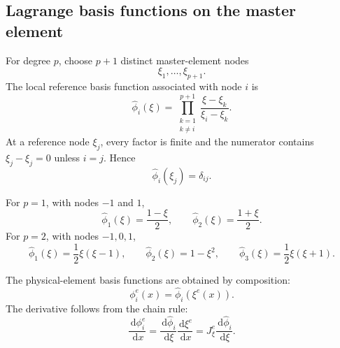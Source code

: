 \documentclass[11pt]{article}
\newcommand{\dd}{\,\mathrm{d}}
\begin{document}
\subsection{Lagrange basis functions on the master element}

For degree $p$, choose $p+1$ distinct master-element nodes
\[
\xi_1,\ldots,\xi_{p+1}.
\]
The local reference basis function associated with node $i$ is
\begin{equation}
\boxed{
\widehat\phi_i(\xi)
=
\prod_{\substack{k=1\\k\neq i}}^{p+1}
\frac{\xi-\xi_k}{\xi_i-\xi_k}.}
\label{eq:lagrange}
\end{equation}
At a reference node $\xi_j$, every factor is finite and the numerator contains
$\xi_j-\xi_j=0$ unless $i=j$. Hence
\begin{equation}
\widehat\phi_i(\xi_j)=\delta_{ij}.
\label{eq:ref-nodal}
\end{equation}

For $p=1$, with nodes $-1$ and $1$,
\[
\widehat\phi_1(\xi)=\frac{1-\xi}{2},
\qquad
\widehat\phi_2(\xi)=\frac{1+\xi}{2}.
\]
For $p=2$, with nodes $-1,0,1$,
\begin{equation}
\widehat\phi_1(\xi)=\frac12\xi(\xi-1),
\qquad
\widehat\phi_2(\xi)=1-\xi^2,
\qquad
\widehat\phi_3(\xi)=\frac12\xi(\xi+1).
\label{eq:quadratic-reference}
\end{equation}

\begin{center}
\end{center}

The physical-element basis functions are obtained by composition:
\begin{equation}
\phi_i^e(x)=\widehat\phi_i(\xi^e(x)).
\label{eq:physical-basis}
\end{equation}
The derivative follows from the chain rule:
\begin{equation}
\frac{\dd\phi_i^e}{\dd x}
=
\frac{\dd\widehat\phi_i}{\dd\xi}
\frac{\dd\xi^e}{\dd x}
=
J_\xi^e\frac{\dd\widehat\phi_i}{\dd\xi}.
\label{eq:derivative-transform}
\end{equation}
\end{document}
